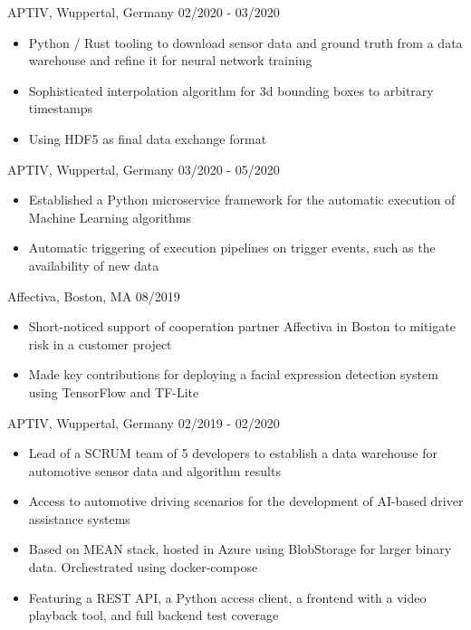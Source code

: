 \documentclass[singlesided,
               paper=a4,
               fontsize=10pt
              ]{my-resume}
\begin{document}
%
    {APTIV, Wuppertal, Germany}
    {02/2020 - 03/2020}
    {\begin{itemize}[leftmargin=2em]
        \item Python / Rust tooling to download sensor data and ground truth from a data warehouse and refine it for neural network training
        \item Sophisticated interpolation algorithm for 3d bounding boxes to arbitrary timestamps
        \item Using HDF5 as final data exchange format
    \end{itemize}}
%
    {APTIV, Wuppertal, Germany}
    {03/2020 - 05/2020}
    {\begin{itemize}[leftmargin=2em]
        \item Established a Python microservice framework for the automatic execution of Machine Learning algorithms
        \item Automatic triggering of execution pipelines on trigger events, such as the availability of new data
    \end{itemize}}
%
    {Affectiva, Boston, MA}
    {08/2019}
    {\begin{itemize}[leftmargin=2em]
        \item Short-noticed support of cooperation partner Affectiva in Boston to mitigate risk in a customer project
        \item Made key contributions for deploying a facial expression detection system using TensorFlow and TF-Lite
    \end{itemize}}
%
    {APTIV, Wuppertal, Germany}
    {02/2019 - 02/2020}
    {\begin{itemize}[leftmargin=2em]
        \item Lead of a SCRUM team of 5 developers to establish a data warehouse for automotive sensor data and algorithm results
        \item Access to automotive driving scenarios for the development of AI-based driver assistance systems
        \item Based on MEAN stack, hosted in Azure using BlobStorage for larger binary data. Orchestrated using docker-compose
        \item Featuring a REST API, a Python access client, a frontend with a video playback tool, and full backend test coverage
    \end{itemize}}
\end{document}
